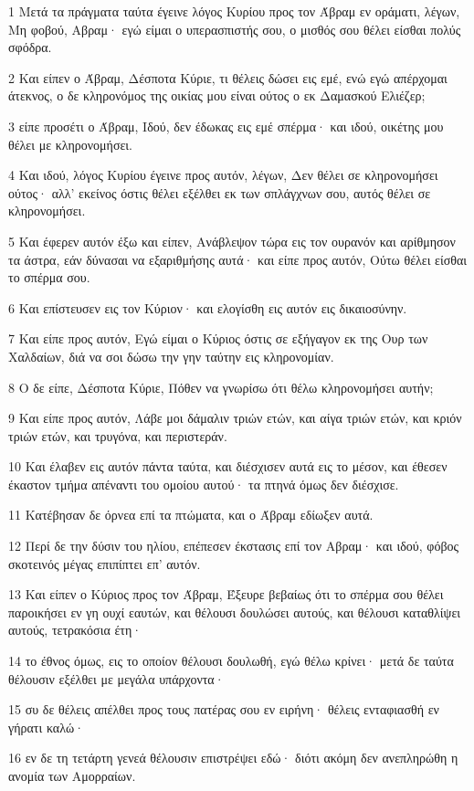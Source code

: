 \par 1 Μετά τα πράγματα ταύτα έγεινε λόγος Κυρίου προς τον Άβραμ εν οράματι, λέγων, Μη φοβού, Αβραμ· εγώ είμαι ο υπερασπιστής σου, ο μισθός σου θέλει είσθαι πολύς σφόδρα.
\par 2 Και είπεν ο Άβραμ, Δέσποτα Κύριε, τι θέλεις δώσει εις εμέ, ενώ εγώ απέρχομαι άτεκνος, ο δε κληρονόμος της οικίας μου είναι ούτος ο εκ Δαμασκού Ελιέζερ;
\par 3 είπε προσέτι ο Άβραμ, Ιδού, δεν έδωκας εις εμέ σπέρμα· και ιδού, οικέτης μου θέλει με κληρονομήσει.
\par 4 Και ιδού, λόγος Κυρίου έγεινε προς αυτόν, λέγων, Δεν θέλει σε κληρονομήσει ούτος· αλλ' εκείνος όστις θέλει εξέλθει εκ των σπλάγχνων σου, αυτός θέλει σε κληρονομήσει.
\par 5 Και έφερεν αυτόν έξω και είπεν, Ανάβλεψον τώρα εις τον ουρανόν και αρίθμησον τα άστρα, εάν δύνασαι να εξαριθμήσης αυτά· και είπε προς αυτόν, Ούτω θέλει είσθαι το σπέρμα σου.
\par 6 Και επίστευσεν εις τον Κύριον· και ελογίσθη εις αυτόν εις δικαιοσύνην.
\par 7 Και είπε προς αυτόν, Εγώ είμαι ο Κύριος όστις σε εξήγαγον εκ της Ουρ των Χαλδαίων, διά να σοι δώσω την γην ταύτην εις κληρονομίαν.
\par 8 Ο δε είπε, Δέσποτα Κύριε, Πόθεν να γνωρίσω ότι θέλω κληρονομήσει αυτήν;
\par 9 Και είπε προς αυτόν, Λάβε μοι δάμαλιν τριών ετών, και αίγα τριών ετών, και κριόν τριών ετών, και τρυγόνα, και περιστεράν.
\par 10 Και έλαβεν εις αυτόν πάντα ταύτα, και διέσχισεν αυτά εις το μέσον, και έθεσεν έκαστον τμήμα απέναντι του ομοίου αυτού· τα πτηνά όμως δεν διέσχισε.
\par 11 Κατέβησαν δε όρνεα επί τα πτώματα, και ο Άβραμ εδίωξεν αυτά.
\par 12 Περί δε την δύσιν του ηλίου, επέπεσεν έκστασις επί τον Αβραμ· και ιδού, φόβος σκοτεινός μέγας επιπίπτει επ' αυτόν.
\par 13 Και είπεν ο Κύριος προς τον Άβραμ, Έξευρε βεβαίως ότι το σπέρμα σου θέλει παροικήσει εν γη ουχί εαυτών, και θέλουσι δουλώσει αυτούς, και θέλουσι καταθλίψει αυτούς, τετρακόσια έτη·
\par 14 το έθνος όμως, εις το οποίον θέλουσι δουλωθή, εγώ θέλω κρίνει· μετά δε ταύτα θέλουσιν εξέλθει με μεγάλα υπάρχοντα·
\par 15 συ δε θέλεις απέλθει προς τους πατέρας σου εν ειρήνη· θέλεις ενταφιασθή εν γήρατι καλώ·
\par 16 εν δε τη τετάρτη γενεά θέλουσιν επιστρέψει εδώ· διότι ακόμη δεν ανεπληρώθη η ανομία των Αμορραίων.
